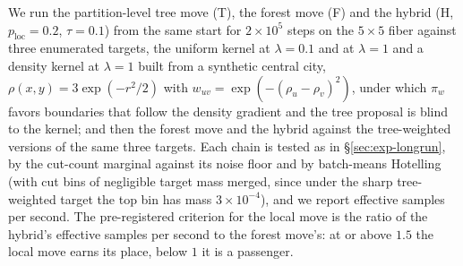 \documentclass[11pt]{article}
\begin{document}
We run the partition-level tree move (T), the forest move (F) and
the hybrid (H, $p_{\mathrm{loc}} = 0.2$, $\tau = 0.1$) from the same
start for $2 \times 10^5$ steps on the $5 \times 5$ fiber against
three enumerated targets, the uniform kernel at $\lambda = 0.1$ and
at $\lambda = 1$ and a density kernel at $\lambda = 1$ built from a
synthetic central city, $\rho(x,y) = 3\exp(-r^2/2)$ with
$w_{uv} = \exp(-(\rho_u - \rho_v)^2)$, under which $\pi_w$ favors
boundaries that follow the density gradient and the tree proposal is
blind to the kernel; and then the forest move and the hybrid against
the tree-weighted versions of the same three targets. Each chain is
tested as in \S\ref{sec:exp-longrun}, by the cut-count marginal
against its noise floor and by batch-means Hotelling (with cut bins
of negligible target mass merged, since under the sharp tree-weighted
target the top bin has mass $3 \times 10^{-4}$), and we report
effective samples per second. The pre-registered criterion for the
local move is the ratio of the hybrid's effective samples per second
to the forest move's: at or above $1.5$ the local move earns its
place, below $1$ it is a passenger.
\end{document}
